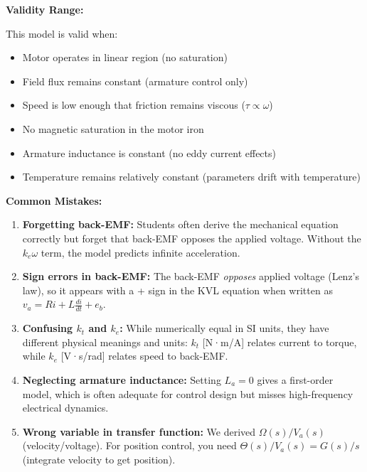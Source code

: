 \begin{example}
\textbf{Validity Range:}

This model is valid when:
\begin{itemize}
    \item Motor operates in linear region (no saturation)
    \item Field flux remains constant (armature control only)
    \item Speed is low enough that friction remains viscous ($\tau \propto \omega$)
    \item No magnetic saturation in the motor iron
    \item Armature inductance is constant (no eddy current effects)
    \item Temperature remains relatively constant (parameters drift with temperature)
\end{itemize}

\textbf{Common Mistakes:}

\begin{enumerate}
    \item \textbf{Forgetting back-EMF:} Students often derive the mechanical equation correctly but forget that back-EMF opposes the applied voltage. Without the $k_e\omega$ term, the model predicts infinite acceleration.

    \item \textbf{Sign errors in back-EMF:} The back-EMF \textit{opposes} applied voltage (Lenz's law), so it appears with a + sign in the KVL equation when written as $v_a = Ri + L\frac{di}{dt} + e_b$.

    \item \textbf{Confusing $k_t$ and $k_e$:} While numerically equal in SI units, they have different physical meanings and units: $k_t$ [N·m/A] relates current to torque, while $k_e$ [V·s/rad] relates speed to back-EMF.

    \item \textbf{Neglecting armature inductance:} Setting $L_a = 0$ gives a first-order model, which is often adequate for control design but misses high-frequency electrical dynamics.

    \item \textbf{Wrong variable in transfer function:} We derived $\Omega(s)/V_a(s)$ (velocity/voltage). For position control, you need $\Theta(s)/V_a(s) = G(s)/s$ (integrate velocity to get position).
\end{enumerate}

\end{example}

